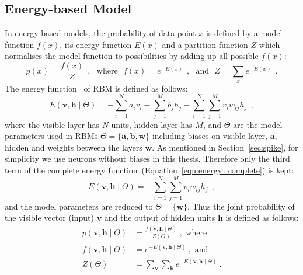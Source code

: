 \subsection{Energy-based Model}
In energy-based models, the probability of data point $x$ is defined by a model function $f(x)$, its energy function $E(x)$ and a partition function $Z$ which normalises the model function to possibilities by adding up all possible $f(x)$:
\begin{equation}
p(x) = \dfrac{f(x)}{Z}~~, \textrm{~~where~~} f(x) =e^{-E(x)}~~,  \textrm{~~and~~}
 Z = \sum_{x} e^{-E(x)}~~.
\end{equation} 
The energy function~\citep{hopfield1982neural} of \protect{} \protect{} RBM is defined as follows:
\begin{equation}
E(\mathbf{v}, \mathbf{h} \mid \Theta)= -\sum_{i=1}^N a_i v_i - \sum_{j=1}^M b_j h_j - \sum_{i=1}^N \sum_{j=1}^M v_i w_{ij} h_j~~,
\label{equ:energy_complete}
\end{equation}
where the visible layer has $ N $ units, \protect{} hidden layer has $ M $, and $ \Theta$ are the model parameters used in RBMs $ \Theta =\{\mathbf{a}, \mathbf{b}, \mathbf{w}\} $ including biases on \protect{} visible layer, $\mathbf{a}$, \protect{} hidden \protect{} \protect{} and weights between the layers $\mathbf{w}$.
As mentioned in Section~\ref{sec:spike}, for simplicity we use neurons without biases in this thesis.
Therefore only the third term of the complete energy function~(Equation~\ref{equ:energy_complete}) is kept:
\begin{equation}
E(\mathbf{v}, \mathbf{h} \mid \Theta)= - \sum_{i=1}^N \sum_{j=1}^M v_i w_{ij} h_j~~,
\label{equ:rbm_energy}
\end{equation}
and the model parameters are reduced to  $ \Theta = \{\mathbf{w}\} $.
Thus the joint probability of the visible vector (input) $\mathbf{v}$ and the output of \protect{} hidden units $\mathbf{h}$ is defined as follows: 
\begin{equation}
\begin{aligned}
p(\mathbf{v}, \mathbf{h} \mid \Theta) &=\frac{f(\mathbf{v}, \mathbf{h} \mid \Theta)}{Z(\Theta)}~,  \textrm{~where~} \\
f(\mathbf{v}, \mathbf{h} \mid \Theta) &=e^{-E(\mathbf{v}, \mathbf{h} \mid \Theta)}~,  \textrm{~and~} \\
Z(\Theta) &= \sum_{\mathbf{v}} \sum_{\mathbf{h}} e^{-E(\mathbf{v}, \mathbf{h} \mid \Theta)}~.
\end{aligned}
\label{equ:rbm_prob}
\end{equation}

